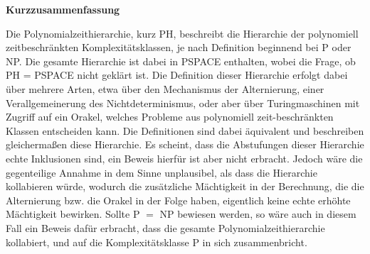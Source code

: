 \newpage

\vspace*{1cm}

\begin{center}
    \textbf{Kurzzusammenfassung}
\end{center}

\vspace*{1cm}

\noindent 
Die Polynomialzeithierarchie, kurz PH, beschreibt die Hierarchie der polynomiell zeitbeschränkten Komplexitätsklassen, je nach Definition beginnend bei P oder NP.
Die gesamte Hierarchie ist dabei in PSPACE enthalten, wobei die Frage, ob PH = PSPACE nicht geklärt ist.
Die Definition dieser Hierarchie erfolgt dabei über mehrere Arten, etwa über den Mechanismus der Alternierung, einer Verallgemeinerung des Nichtdeterminismus, oder aber über Turingmaschinen mit Zugriff auf ein Orakel, welches 
Probleme aus polynomiell zeit-beschränkten Klassen entscheiden kann. Die Definitionen sind dabei äquivalent und beschreiben gleichermaßen diese Hierarchie. Es scheint, dass die Abstufungen
dieser Hierarchie echte Inklusionen sind, ein Beweis hierfür ist aber nicht erbracht. Jedoch wäre die gegenteilige Annahme in dem Sinne unplausibel, als dass die Hierarchie kollabieren würde, wodurch die zusätzliche Mächtigkeit in der Berechnung, die 
die Alternierung bzw. die Orakel in der Folge haben, eigentlich keine echte erhöhte Mächtigkeit bewirken. Sollte P $=$ NP bewiesen werden, so wäre auch in diesem Fall ein Beweis dafür erbracht, dass die gesamte Polynomialzeithierarchie kollabiert, und auf die Komplexitätsklasse P in sich zusammenbricht.